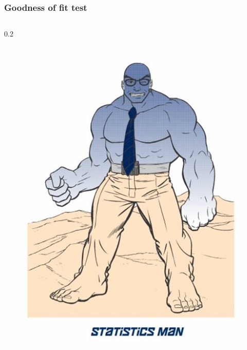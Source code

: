 \documentclass{beamer}
\begin{document}
\begin{frame}
  \frametitle{Goodness of fit test}
  \begin{columns}
    \begin{column} {0.2 \textwidth}

    \begin{figure}
      \centering
        \includegraphics[width=\textwidth]{img/les6-man.jpg}
    \end{figure}

    \end{column}


\end{columns}
\end{frame}
\end{document}
